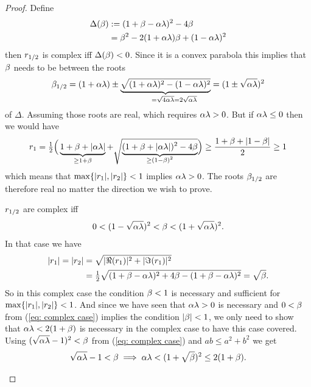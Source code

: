 \begin{proof}
	Define
	\begin{align*}
		\Delta(\beta)
		&:= (1+\beta-\alpha\lambda)^2 - 4\beta\\
		&= \beta^2 - 2(1+\alpha\lambda)\beta + (1-\alpha\lambda)^2
	\end{align*}
	then \(r_{1/2}\) is complex iff \(\Delta(\beta)<0\). Since it is a
	convex parabola this implies that \(\beta\) needs to be between the roots
	\begin{align*}
		\momCoeff_{1/2}
		= (1+\lrSq\hesseEV) \pm 
		\underbrace{
			\sqrt{(1+\lrSq\hesseEV)^2 - (1-\lrSq\hesseEV)^2}
		}_{=\sqrt{4\lrSq\hesseEV}=\mathrlap{2\sqrt{\lrSq\hesseEV}}}
		= (1\pm \sqrt{\lrSq\hesseEV})^2	
	\end{align*}
	of \(\Delta\). Assuming those roots are real, which requires \(\alpha\lambda>0\).
	But if \(\alpha\lambda\le0\) then we would have
	\begin{align*}
		r_1
		= \tfrac12 \Big(
			\underbrace{1+\beta+|\alpha\lambda|}_{\ge 1+\beta}
			+ \sqrt{\underbrace{(1+\beta+|\alpha\lambda|)^2 - 4\beta}_{\smash{\ge (1-\beta)^2}}}
		\Big)
		\ge \frac{1+\beta + |1-\beta|}2 \ge 1
	\end{align*}
	which means that \(\max\{|r_1|,|r_2|\}<1\) implies \(\alpha\lambda>0\).
	The roots \(\beta_{1/2}\) are therefore real no matter the direction we
	wish to prove.
	\begin{description}[wide, labelindent=0pt]
	\item[Complex Case:]
		\(r_{1/2}\) are complex iff	
		\begin{align}\label{eq: complex case}
			0 < (1-\sqrt{\alpha\lambda})^2 < \beta < (1+\sqrt{\alpha\lambda})^2.
		\end{align}
		In that case we have
		\begin{align*}
			|r_1| = |r_2|
			&= \sqrt{|\Re(r_1)|^2 + |\Im(r_1)|^2}\\
			&= \tfrac12 \sqrt{(1+\beta-\alpha\lambda)^2 + 4\beta - (1+\beta-\alpha\lambda)^2}
			= \sqrt{\beta}.
		\end{align*}
		So in this complex case the condition
		\(\beta<1\) is necessary and sufficient for \(\max\{|r_1|,|r_2|\}<1\).
		And since we have seen that \(\alpha\lambda>0\) is necessary and \(0<\beta\)
		from (\ref{eq: complex case}) implies the condition \(|\beta|<1\), we only
		need to show that \(\alpha\lambda <2(1+\beta)\) is necessary in the complex
		case to have this case covered. Using \((\sqrt{\alpha\lambda}-1)^2 < \beta\)
		from (\ref{eq: complex case}) and \(ab \le a^2 + b^2\) we get
		\begin{align*}
			\sqrt{\alpha\lambda} - 1
			< \beta \implies \alpha\lambda < (1+\sqrt{\beta})^2
			\le 2(1+\beta).
		\end{align*}


\end{description}
\end{proof}
